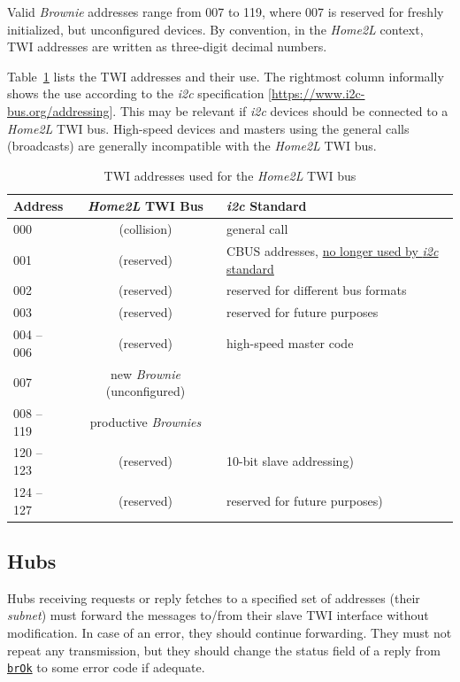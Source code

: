 \documentclass[12pt,english,parskip=half,headheight=19pt]{scrreprt}
\newcommand{\refapic}[1]{\href{home2l-api_c/index.html}{\mbox{\texttt{#1}}}}            %
\begin{document}
Valid \textit{Brownie} addresses range from 007 to 119, where 007 is reserved for freshly initialized, but unconfigured devices. By convention, in the \textit{Home2L} context, TWI addresses are written as three-digit decimal numbers.

Table~\ref{tab:brownies-addresses} lists the TWI addresses and their use. The rightmost column informally shows the use according to the \textit{i2c} specification [\url{https://www.i2c-bus.org/addressing}]. This may be relevant if \textit{i2c} devices should be connected to a \textit{Home2L} TWI bus. High-speed devices and masters using the general calls (broadcasts) are generally incompatible with the \textit{Home2L} TWI bus.

\begin{table}[ht]
  \centering
  \renewcommand{\arraystretch}{1.4}
  \begin{tabular}{l|c|l}
    Address & \textit{Home2L} TWI Bus & \textit{i2c} Standard \\
    \hline \hline
    000        & (collision)   & general call \\
    001        & (reserved)    & CBUS addresses, \href{https://www.i2c-bus.org/addressing/cbus-addresses}{no longer used by \textit{i2c} standard} \\
    002        & (reserved)    & reserved for different bus formats \\
    003        & (reserved)    & reserved for future purposes \\
    004 -- 006 & (reserved)    & high-speed master code \\
    007        & new \textit{Brownie} (unconfigured) & \\
    008 -- 119 & productive \textit{Brownies} \\
    120 -- 123 & (reserved)    & 10-bit slave addressing) \\
    124 -- 127 & (reserved)    & reserved for future purposes) \\
  \end{tabular}
  \caption[l]{TWI addresses used for the \textit{Home2L} TWI bus}
  \label{tab:brownies-addresses}
\end{table}



\subsection{Hubs}
\label{sec:brownies-bus-hubs}

Hubs receiving requests or reply fetches to a specified set of addresses (their \textit{subnet}) must forward the messages to/from their slave TWI interface without modification. In case of an error, they should continue forwarding. They must not repeat any transmission, but they should change the status field of a reply from \refapic{brOk} to some error code if adequate.
\end{document}
